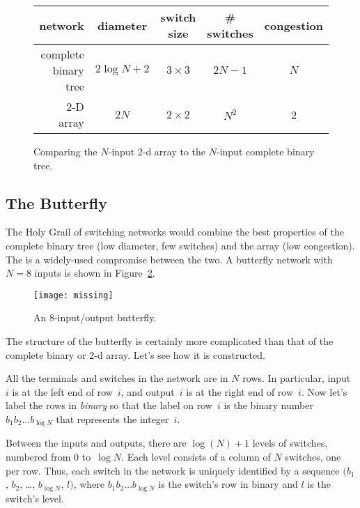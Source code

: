 \begin{figure}

\begin{tabular}{r|c|c|c|c}
\textbf{network} &
\textbf{diameter} &
\textbf{switch size} &
\textbf{\# switches} &
\textbf{congestion} \\ \hline
complete binary tree & $2 \log N + 2$ & $3 \times 3$ & $2N - 1$ & $N$ \\
2-D array            & $2 N$          & $2 \times 2$ & $N^2$    & 2
\end{tabular}

\caption{Comparing the $N$-input 2-d array to the $N$-input
  complete binary tree.}

\label{fig:6EM}

\end{figure}

\subsection{The Butterfly}

The Holy Grail of switching networks would combine the best properties
of the complete binary tree (low diameter, few switches) and the array
(low congestion).  The  is a widely-used compromise
between the two. A butterfly network with $N = 8$ inputs is shown in
Figure~\ref{fig:6EN}.

\begin{figure}


\texttt{[image: missing]}

\caption{An 8-input/output butterfly.}

\label{fig:6EN}

\end{figure}

The structure of the butterfly is certainly more complicated than that
of the complete binary or 2-d array.  Let's see how it is constructed.

All the terminals and switches in the network are in $N$ rows.  In
particular, input~$i$ is at the left end of row~$i$, and output~$i$ is
at the right end of row~$i$.  Now let's label the rows in
\emph{binary} so that the label on row~$i$ is the binary number
$b_1b_2\dots b_{\log N}$ that represents the integer~$i$.

Between the inputs and outputs, there are $\log(N) + 1$ levels of
switches, numbered from 0 to~$\log N$.  Each level consists of a
column of $N$ switches, one per row.  Thus, each switch in the network
is uniquely identified by a sequence $(b_1$, $b_2$, \dots, $b_{\log
  N}$, $l)$, where $b_1 b_2 \dots b_{\log N}$ is the switch's row in
binary and $l$ is the switch's level.


